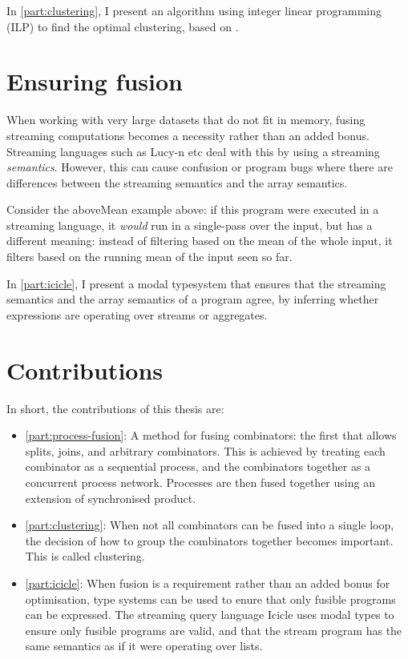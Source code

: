 In \autoref{part:clustering}, I present an algorithm using integer linear programming (ILP) to find the optimal clustering, based on \citet{megiddo1998optimal}.

\section{Ensuring fusion}

When working with very large datasets that do not fit in memory, fusing streaming computations becomes a necessity rather than an added bonus.
Streaming languages such as Lucy-n etc deal with this by using a streaming \emph{semantics}.
However, this can cause confusion or program bugs where there are differences between the streaming semantics and the array semantics.

Consider the aboveMean example above: if this program were executed in a streaming language, it \emph{would} run in a single-pass over the input, but has a different meaning: instead of filtering based on the mean of the whole input, it filters based on the running mean of the input seen so far.

In \autoref{part:icicle}, I present a modal typesystem that ensures that the streaming semantics and the array semantics of a program agree, by inferring whether expressions are operating over streams or aggregates.

\section{Contributions}

In short, the contributions of this thesis are:

\begin{itemize}
\item
\autoref{part:process-fusion}:
A method for fusing combinators: the first that allows splits, joins, and arbitrary combinators.
This is achieved by treating each combinator as a sequential process, and the combinators together as a concurrent process network.
Processes are then fused together using an extension of synchronised product.


\item
\autoref{part:clustering}:
When not all combinators can be fused into a single loop, the decision of how to group the combinators together becomes important.
This is called clustering.

\item
\autoref{part:icicle}:
When fusion is a requirement rather than an added bonus for optimisation, type systems can be used to enure that only fusible programs can be expressed.
The streaming query language Icicle uses modal types to ensure only fusible programs are valid, and that the stream program has the same semantics as if it were operating over lists.
\end{itemize}



